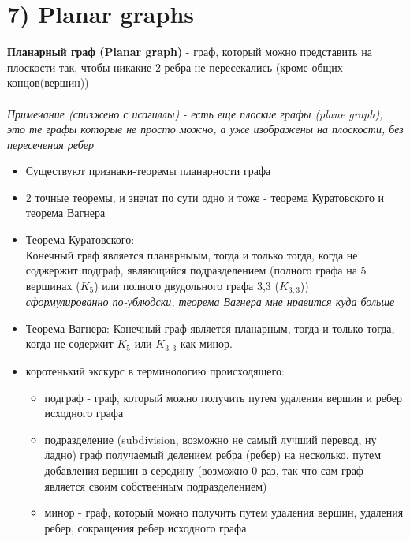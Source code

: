 \documentclass[../TM3-UltraDoc.tex]{subfiles}
\begin{document}
	\section*{7) Planar graphs}
	\textbf{Планарный граф (Planar graph)} - граф, который можно представить на плоскости так, чтобы никакие 2 ребра не пересекались (кроме общих концов(вершин))\\
	\\
	\textit{Примечание (спизжено с исагиллы) - есть еще плоские графы (plane graph), это те графы которые не просто можно, а уже изображены на плоскости, без пересечения ребер}\\
	\small
	\begin{tcolorbox}[colframe=gray!50!black, left=5pt, right=5pt, top=5pt, bottom=5pt, boxrule=1pt, colback=gray!10!white, title=\text{Ладно, теперь поговорим серьезно}]
		\begin {itemize}
		\item Существуют признаки-теоремы планарности графа
		\item 2 точные теоремы, и значат по сути одно и тоже - теорема Куратовского и теорема Вагнера
		\item Теорема Куратовского:\\
		Конечный граф является планарныым, тогда и только тогда, когда не соджержит подграф, являющийся подразделением (полного графа на 5 вершинах ($K_5$) или полного двудольного графа 3,3 ($K_{3,3}$))\\
		\textit{сформулированно по-ублюдски, теорема Вагнера мне нравится куда больше}
		\item Теорема Вагнера:
		Конечный граф является планарным, тогда и только тогда, когда не содержит $K_5$ или $K_{3,3}$ как минор.
		\item коротенький экскурс в терминологию происходящего:
			\begin{itemize}
				\item подграф - граф, который можно получить путем удаления вершин и ребер исходного графа
				\item подразделение (subdivision, возможно не самый лучший перевод, ну ладно) граф получаемый делением ребра (ребер) на несколько, путем добавления вершин в середину (возможно 0 раз, так что сам граф является своим собственным подразделением)
				\item минор - граф, который можно получить путем удаления вершин, удаления ребер, сокращения ребер исходного графа
			\end{itemize}

\end{itemize}
\end{tcolorbox}
\end{document}
